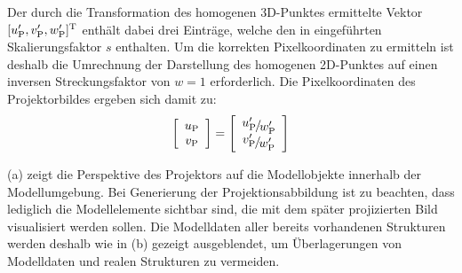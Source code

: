 
Der durch die Transformation des homogenen 3D-Punktes ermittelte Vektor $[u_{{\mathrm{P}}}',v_{{\mathrm{P}}}',w_{{\mathrm{P}}}']^{\mathrm{T}}$ enthält dabei drei Einträge, welche den in  eingeführten Skalierungsfaktor $s$ enthalten. Um die korrekten Pixelkoordinaten zu ermitteln ist deshalb die Umrechnung der Darstellung des homogenen 2D-Punktes auf einen inversen Streckungsfaktor von $w=1$ erforderlich. Die Pixelkoordinaten des Projektorbildes ergeben sich damit zu:
%
\begin{equation}
\left[\begin{array}{c}
u_{\ind{P}}\\
v_{\ind{P}}
\end{array}\right]
=
\left[\begin{array}{c}
\nicefrac{u_{\ind{P}}'}{w_{\ind{P}}'}\\
\nicefrac{v_{\ind{P}}'}{w_{\ind{P}}'}
\end{array}\right]
\end{equation}

 (a) zeigt die Perspektive des Projektors auf die Modellobjekte innerhalb der Modellumgebung. Bei Generierung der Projektionsabbildung ist zu beachten, dass lediglich die Modellelemente sichtbar sind, die mit dem später projizierten Bild visualisiert werden sollen. Die Modelldaten aller bereits vorhandenen Strukturen werden deshalb wie in  (b) gezeigt ausgeblendet, um Überlagerungen von Modelldaten und realen Strukturen zu vermeiden.

\prever{
}

